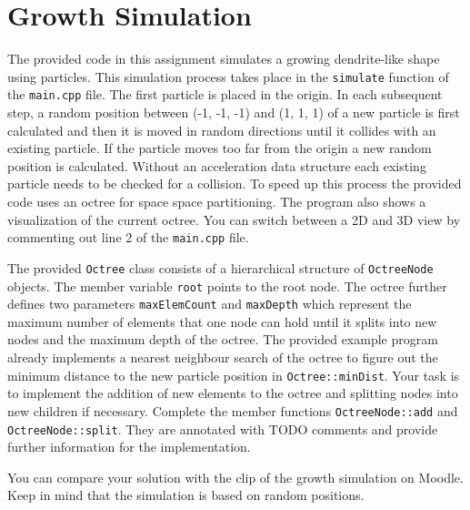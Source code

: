 \documentclass[12pt, a4paper, oneside, ngerman]{article}
\begin{document}


\section{Growth Simulation}
The provided code in this assignment simulates a growing dendrite-like shape using particles. This simulation process takes place in the \texttt{simulate} function of the \texttt{main.cpp} file. The first particle is placed in the origin. In each subsequent step, a random position between (-1, -1, -1) and (1, 1, 1) of a new particle is first calculated and then it is moved in random directions until it collides with an existing particle. If the particle moves too far from the origin a new random position is calculated. Without an acceleration data structure each existing particle needs to be checked for a collision. To speed up this process the provided code uses an octree for space space partitioning. The program also shows a visualization of the current octree. You can switch between a 2D and 3D view by commenting out line 2 of the \texttt{main.cpp} file.

\label{ex:octree}

The provided \texttt{Octree} class consists of a hierarchical structure of \texttt{OctreeNode} objects. The member variable \texttt{root} points to the root node. The octree further defines two parameters \texttt{maxElemCount} and \texttt{maxDepth} which represent the maximum number of elements that one node can hold until it splits into new nodes and the maximum depth of the octree. The provided example program already implements a nearest neighbour search of the octree to figure out the minimum distance to the new particle position in \texttt{Octree::minDist}. Your task is to implement the addition of new elements to the octree and splitting nodes into new children if necessary. Complete the member functions \texttt{OctreeNode::add} and \texttt{OctreeNode::split}. They are annotated with TODO comments and provide further information for the implementation.

You can compare your solution with the clip of the growth simulation on Moodle. Keep in mind that the simulation is based on random positions.
\end{document}
